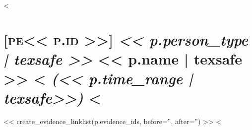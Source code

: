 <%
\section*{\hypertarget{person<<p.id>>}{\textsc{[pe<< p.id >>]}}
    \emph{<< p.person_type | texsafe >>}
    << p.name | texsafe >>
    <%
    \emph{ (<< p.time_range | texsafe>>)}
    <%
  }

<< create_evidence_linklist(p.evidence_ids, before='', after='') >>
<%
